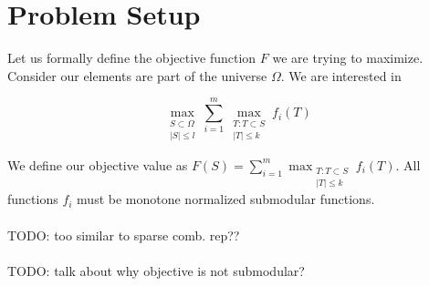 \section{Problem Setup}
\label{sec::setup}

Let us formally define the objective function $F$ we are trying to maximize. Consider our elements are part of the universe $\Omega$. We are interested in 

\[
	\max_{\substack{S \subset \Omega \\ |S| \leq l}} \sum_{i = 1}^{m} \max_{\substack{T:T \subset S \\ |T| \leq k}} f_i(T)
\]

We define our objective value as $F(S) = \sum_{i = 1}^{m} \max_{\substack{T:T \subset S \\ |T| \leq k}} f_i(T)$. All functions $f_i$ must be monotone normalized submodular functions. \\
\\
TODO: too similar to sparse comb. rep?? \\
\\
TODO: talk about why objective is not submodular? \\


